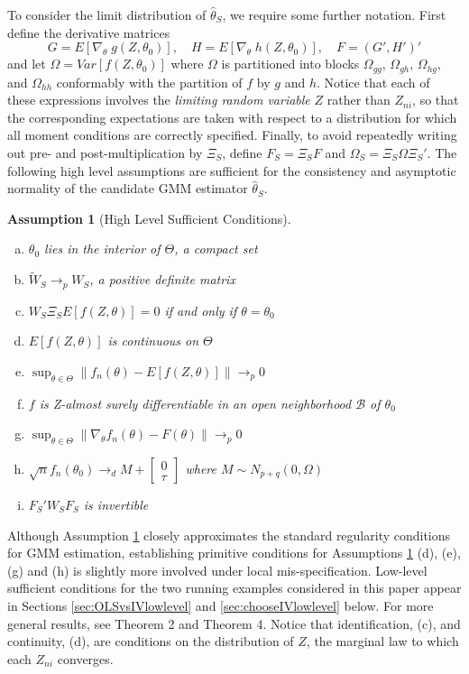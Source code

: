 \documentclass[12pt]{article}
\newtheorem{assump}{Assumption}[section]
\theoremstyle{definition}
\begin{document}
To consider the limit distribution of $\widehat{\theta}_S$, we require some further notation. 
First define the derivative matrices
	$$G = E\left[\nabla_{\theta} \; g(Z,\theta_0)\right], \quad H = E\left[\nabla_{\theta} \; h(Z,\theta_0)\right], \quad F = (G', H')'$$
and let $\Omega = Var\left[ f(Z,\theta_0) \right]$ where $\Omega$ is partitioned into blocks $\Omega_{gg}$, $\Omega_{gh}$, $\Omega_{hg}$, and $\Omega_{hh}$ conformably with the partition of $f$ by $g$ and $h$. 
Notice that each of these expressions involves the \emph{limiting random variable} $Z$ rather than $Z_{ni}$, so that the corresponding expectations are taken with respect to a distribution for which all moment conditions are correctly specified. 
Finally, to avoid repeatedly writing out pre- and post-multiplication by $\Xi_S$, define $F_S = \Xi_S F$ and $\Omega_S = \Xi_S \Omega\Xi_S'$. 
The following high level assumptions are sufficient for the consistency and asymptotic normality of the candidate GMM estimator $\widehat{\theta}_S$. 
\begin{assump}[High Level Sufficient Conditions]
\label{assump:highlevel} 
\mbox{}
	\begin{enumerate}[(a)]
		\item $\theta_0$ lies in the interior of $\Theta$, a compact set
		\item $\widetilde{W}_S \rightarrow_{p} W_S$, a positive definite matrix
		\item $W_S \Xi_S E[f(Z,\theta)]=0$ if and only if $\theta = \theta_0$
		\item $E[f(Z,\theta)]$ is continuous on $\Theta$
		\item $\sup_{\theta \in \Theta}\| f_n(\theta)- E[f(Z,\theta)]\|\rightarrow_{p} 0$
		\item $f$ is Z-almost surely differentiable in an open neighborhood $\mathcal{B}$ of $\theta_0$
		\item $\sup_{\theta \in \Theta} \|\nabla_{\theta}f_n(\theta) - F(\theta)\|\rightarrow_{p} 0$
		\item $\sqrt{n}f_n(\theta_0) \rightarrow_d  M + \left[\begin{array}{c}0\\ \tau \end{array} \right]$ where $M \sim N_{p+q}\left(0, \Omega \right)$
		\item $F_S'W_SF_S$ is invertible
	\end{enumerate}
\end{assump}

Although Assumption \ref{assump:highlevel} closely approximates the standard regularity conditions for GMM estimation, establishing primitive conditions for Assumptions \ref{assump:highlevel} (d), (e), (g) and (h) is slightly more involved under local mis-specification. 
Low-level sufficient conditions for the two running examples considered in this paper appear in Sections \ref{sec:OLSvsIVlowlevel} and  \ref{sec:chooseIVlowlevel} below. 
For more general results, see \cite{Andrews1988} Theorem 2 and \cite{Andrews1992} Theorem 4.  
Notice that identification, (c), and continuity, (d), are conditions on the distribution of $Z$, the marginal law to which each $Z_{ni}$ converges. 
\end{document}
